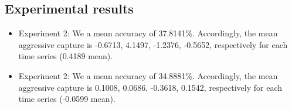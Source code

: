 \documentclass[11pt,letterpaper]{article}
\newcommand{\blue}[1]{\textcolor{RoyalBlue}{#1}}
\newcommand{\instructions}[1]{\blue{\textit{#1}}}
\begin{document}
\subsection{Experimental results}
\label{sec:experimental-results}
\begin{itemize}
\item Experiment 2: We a mean accuracy of
  37.8141\%. Accordingly, the mean aggressive capture is -0.6713, 4.1497,
  -1.2376, -0.5652, respectively for each time series (0.4189 mean).
\item Experiment 2: We a mean accuracy of
  34.8881\%. Accordingly, the mean aggressive capture is 0.1008, 0.0686,
  -0.3618, 0.1542, respectively for each time series (-0.0599 mean).
\end{itemize}
\end{document}
